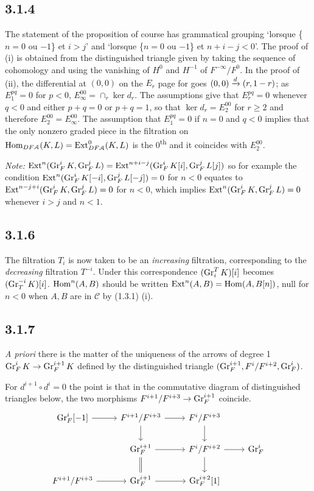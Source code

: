 \documentclass[deligne.tex]{subfiles}
\begin{document}
\subsection*{3.1.4} The statement of the proposition of course has grammatical grouping
`lorsque \{$n=0$ ou $-1$\} et $i>j$' and `lorsque \{$n=0$ ou $-1$\} et 
$n+i-j<0$'. The proof of (i) is obtained from the distinguished triangle
given by taking the sequence of cohomology and using the vanishing of $H^0$
and $H^{-1}$ of $F^{-\infty}/F^0$. In the proof of (ii), the differential
at $(0,0)$ on the $E_r$ page for goes $(0,0)\xrightarrow{d}(r,1-r)$;
as $E_1^{pq}=0$ for $p<0$, $E_\infty^{00}=\cap_r\ker d_r$.
The assumptions give that $E_r^{pq}=0$ whenever $q<0$ and either $p+q=0$ or
$p+q=1$, so that $\ker d_r=E_2^{00}$ for $r\geq2$ and therefore
$E_2^{00}=E_\infty^{00}$. The assumption that $E_1^{pq}=0$ if $n=0$ and
$q<0$ implies that the only nonzero graded piece in the filtration on
$\operatorname{Hom}_{DF\mathcal A}(K,L)=\operatorname{Ext}^0_{DF\mathcal A}(K,L)$ is the 
0\textsuperscript{th} and it coincides with $E_2^{00}$.

\emph{Note:}
$\operatorname{Ext}^n(\operatorname{Gr}_F^iK,\operatorname{Gr}_F^jL)=\operatorname{Ext}^{n+i-j}(\operatorname{Gr}_F^iK[i],\operatorname{Gr}_F^jL[j])$ so
for example the condition $\operatorname{Ext}^{n}(\operatorname{Gr}_F^iK[-i],\operatorname{Gr}_F^jL[-j])=0$ for
$n<0$ equates to $\operatorname{Ext}^{n-j+i}(\operatorname{Gr}_F^iK,\operatorname{Gr}_F^jL)=0$ for $n<0$, which
implies $\operatorname{Ext}^n(\operatorname{Gr}_F^iK,\operatorname{Gr}_F^jL)=0$ whenever $i>j$ and $n<1$.

\subsection*{3.1.6} The filtration $T_i$ is now taken to be an \emph{increasing} 
filtration, corresponding to the \emph{decreasing} filtration $T^{-i}$.
Under this correspondence $(\operatorname{Gr}_i^TK)[i]$ becomes $(\operatorname{Gr}_T^{-i}K)[i]$.
$\operatorname{Hom}^n(A,B)$ should be written $\operatorname{Ext}^n(A,B)=\operatorname{Hom}(A,B[n])$, null for $n<0$
when $A,B$ are in $\mathcal C$ by (1.3.1) (i).

\subsection*{3.1.7}
\emph{A priori} there is the matter of the uniqueness of the arrows of
degree 1 $\operatorname{Gr}_F^iK\rightarrow\operatorname{Gr}_F^{i+1}K$ defined by the distinguished triangle
$(\operatorname{Gr}_F^{i+1},F^i/F^{i+2},\operatorname{Gr}_F^i)$.

For $d^{i+1}\circ d^i=0$ the point is that in the commutative 
diagram of distinguished triangles below, the two morphisms
$F^{i+1}/F^{i+3}\rightarrow\operatorname{Gr}_F^{i+1}$ coincide.
\begin{equation*}\begin{tikzcd}
	\Gr_F^i[-1]\arrow[r]&F^{i+1}/F^{i+3}\arrow[r]\arrow[d]
	&F^i/F^{i+3}\arrow[d] \\
	&\Gr_F^{i+1}\arrow[r]\arrow[d,equals]&F^i/F^{i+2}\arrow[r]\arrow[d]
	&\Gr_F^i \\
	F^{i+1}/F^{i+3}\arrow[r]&\Gr_F^{i+1}\arrow[r]&\Gr_F^{i+2}[1]
\end{tikzcd}\end{equation*}
\end{document}
